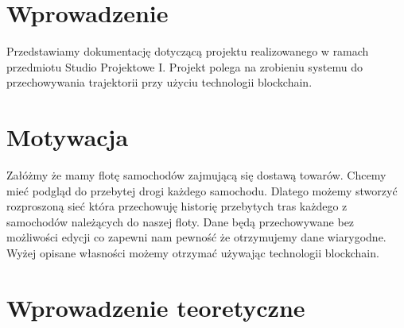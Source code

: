 \documentclass{sprawozdanie-agh}
\begin{document}

\stronatytulowa{}
\tableofcontents 
\newpage
\section{Wprowadzenie}
Przedstawiamy dokumentację dotyczącą projektu realizowanego w ramach przedmiotu Studio Projektowe I. Projekt polega na zrobieniu systemu do przechowywania trajektorii przy użyciu technologii blockchain.

\section{Motywacja}
Załóżmy że mamy flotę samochodów zajmującą się dostawą towarów. Chcemy mieć podgląd do przebytej drogi każdego samochodu. Dlatego możemy stworzyć rozproszoną sieć która przechowuję historię przebytych tras każdego z samochodów należących do naszej floty. Dane będą przechowywane bez możliwości edycji co zapewni nam pewność że otrzymujemy dane wiarygodne. Wyżej opisane własności możemy otrzymać używając technologii blockchain. 

\section{Wprowadzenie teoretyczne}
\end{document}
